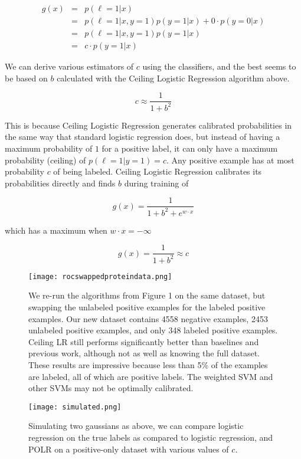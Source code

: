 \documentclass{article}
\begin{document}
\begin{eqnarray*}
g(x) &=& p(\ell=1|x) \\
 &=& p(\ell=1|x,y=1)p(y=1|x) + 0 \cdot p(y=0|x) \\
 &=& p(\ell=1|x,y=1)p(y=1|x) \\
 &=& c \cdot p(y=1|x)
\end{eqnarray*}

We can derive various estimators of $c$ using the classifiers, and the best seems to be based on $b$ calculated with the Ceiling Logistic Regression algorithm above.

$$c \approx \frac{1}{1 + b^2}$$

This is because Ceiling Logistic Regression generates calibrated probabilities in the same way that standard logistic regression does, but instead of having a maximum probability of $1$ for a positive label, it can only have a maximum probability (ceiling) of $p(\ell=1|y=1)=c$. Any positive example has at most probability $c$ of being labeled.  Ceiling Logistic Regression calibrates its probabilities directly and finds $b$ during training of

$$g(x) = \frac{1}{1 + b^2 + e^{w \cdot x}}$$

which has a maximum when $w \cdot x=-\infty$

$$g(x) = \frac{1}{1 + b^2} \approx c$$

\begin{figure*}[ht!]
\vskip 0.2in
\begin{center}
\centerline{\texttt{[image: rocswappedproteindata.png]}}
\caption{We re-run the algorithms from Figure 1 on the same dataset, but swapping the unlabeled positive examples for the labeled positive examples. Our new dataset contains 4558 negative examples, 2453 unlabeled positive examples, and only 348 labeled positive examples.  Ceiling LR still performs significantly better than baselines and previous work, although not as well as knowing the full dataset.  These results are impressive because less than 5\% of the examples are labeled, all of which are positive labels. The weighted SVM and other SVMs may not be optimally calibrated.}
\label{rocswapped}
\end{center}
\vskip -0.2in
\end{figure*}

\begin{figure*}[ht!]
\vskip 0.2in
\begin{center}
\centerline{\texttt{[image: simulated.png]}}
\caption{Simulating two gaussians as above, we can compare logistic regression on the true labels as compared to logistic regression, and POLR on a positive-only dataset with various values of $c$.}
\label{synthetic}
\end{center}
\vskip -0.2in
\end{figure*}
\end{document}
